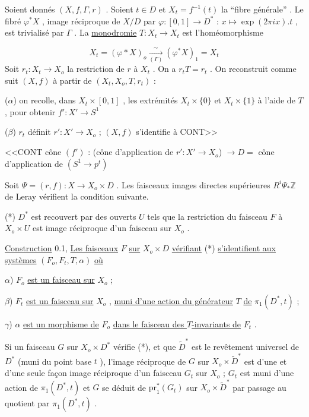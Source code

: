 Soient donnés $(X, f, \Gamma , r)$ . Soient $t \in D$ et $X_t = f^{-1}(t)$ la ``fibre générale'' . Le fibré $\varphi^* X$ , image réciproque de $X/D$ par $\varphi : [0, 1] \to D^*$ : $x \longmapsto \exp(2 \pi i x).t$ , est trivialisé par $\Gamma$ . La \underline{monodromie} $T : X_t \longrightarrow X_t$ est l'homéomorphisme

\begin{equation*}
X_t = (\varphi * X)_o \xrightarrow[(\Gamma)]{\sim} (\varphi^* X)_1 = X_t
\end{equation*}
Soit $r_t : X_t \longrightarrow X_o$ la restriction de $r$ à $X_t$ . On a $r_t T = r_t$ . On reconstruit comme suit $(X, f)$ à partir de $(X_t, X_o, T, r_t)$ :

($\alpha$) on recolle, dans $X_t \times [0, 1]$ , les extrémités $X_t \times \{0\}$ et $X_t \times \{1\}$ à l'aide de $T$ , pour obtenir $f' : X' \longrightarrow S^1$

($\beta$) $r_t$ définit $r' : X' \longrightarrow X_o$ ; $(X, f)$ s'identifie à CONT>>



<<CONT cône $(f')$ : (cône d'application de $r' : X' \longrightarrow X_o$) $\longrightarrow D =$ cône d'application de $(S^1 \to p^t)$

Soit $\Psi = (r, f) : X \longrightarrow X_o \times D$ . Les faisceaux images directes supérieures $R^i \Psi_* \mathbb{Z}$ de Leray vérifient la condition suivante.

(*)  $D^*$ est recouvert par des ouverts $U$ tels que la restriction du faisceau $F$ à $X_o \times U$ est image réciproque d'un faisceau sur $X_o$ .

\underline{Construction} 0.1, \underline{Les faisceaux} $F$ \underline{sur} $X_o \times D$ \underline{vérifiant} (*) \underline{s'identifient aux systèmes} $(F_o, F_t, T, \alpha)$ \underline{où}

$\alpha$)  $F_o$  \underline{est un faisceau sur} $X_o$  ;

$\beta$)  $F_t$  \underline{est un faisceau sur} $X_o$  , \underline{muni d'une action du générateur} $T$ \underline{de} $\pi_1(D^*,t)$ ;

$\gamma$)  $\alpha$  \underline{est un morphisme de} $F_o$ \underline{dans le faisceau des $T$-invariants de} $F_t$ .

Si un faisceau $G$ sur $X_o \times D^*$ vérifie (*), et que $\widetilde{D}^*$ est le revêtement universel de $D^*$ (muni du point base $t$ ), l'image réciproque de $G$ sur $X_o \times \widetilde{D}^*$ est d'une et d'une seule façon image réciproque d'un faisceau $G_t$ sur $X_o$  ; $G_t$ est muni d'une action de $\pi_1(D^*, t)$ et $G$ se déduit de $\mathrm{pr}_1^*(G_t)$ sur $X_o \times \widetilde{D}^*$ par passage au quotient par $\pi_1(D^*, t)$ .

